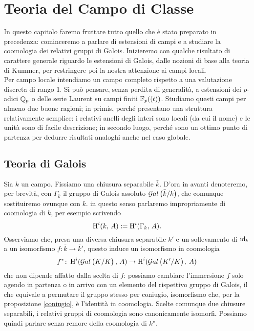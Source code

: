 \chapter{Teoria del Campo di Classe}
In questo capitolo faremo fruttare tutto quello che è stato preparato in precedenza: cominceremo a parlare di estensioni di campi e a studiare la coomologia dei relativi gruppi di Galois. Inizieremo con qualche risultato di carattere generale riguardo le estensioni di Galois, dalle nozioni di base alla teoria di Kummer, per restringere poi la nostra attenzione ai campi locali. \\

Per campo locale intendiamo un campo completo rispetto a una valutazione discreta di rango 1. Si può pensare, senza perdita di generalità, a estensioni dei $ p $-adici $ \mathbb{Q}_p $ o delle serie Laurent su campi finiti $ \mathbb{F}_p((t)) $. Studiamo questi campi per almeno due buone ragioni; in primis, perché presentano una struttura relativamente semplice: i relativi anelli degli interi sono locali (da cui il nome) e le unità sono di facile descrizione; in secondo luogo, perché sono un ottimo punto di partenza per dedurre risultati analoghi anche nel caso globale.



\section{Teoria di Galois}
Sia $ k $ un campo. Fissiamo una chiusura separabile $ \bar{k} $. D'ora in avanti denoteremo, per brevità, con $ \Gamma_k $ il gruppo di Galois assoluto $ \mathcal{G}al\left( \bar{k} / k \right) $, che comunque sostituiremo ovunque con $ k $. in questo senso parlaremo impropriamente di coomologia di $ k $, per esempio scrivendo
\[ \operatorname{H}^i(k, \, A) := \operatorname{H}^i(\Gamma_k, \, A). \]
Osserviamo che, presa una diversa chiusura separabile $ k' $ e un sollevamento di $ \operatorname{id}_{k} $ a un isomorfismo $ f\colon \bar{k} \to \bar{k}' $, questo induce un isomorfismo in coomologia
\[ f^* \colon \operatorname{H}^i(\mathcal{G}al\left( \bar{K} / K \right), \, A) \to \operatorname{H}^i(\mathcal{G}al\left( \bar{K}' / K \right), \, A) \]
che non dipende affatto dalla scelta di $ f $: possiamo cambiare l'immersione $ f $ solo agendo in partenza o in arrivo con un elemento del rispettivo gruppo di Galois, il che equivale a permutare il gruppo stesso per coniugio, isomorfismo che, per la proposizione \ref{coniugio}, è l'identità in coomologia. Scelte comunque due chiusure separabili, i relativi gruppi di coomologia sono canonicamente isomorfi. Possiamo quindi parlare senza remore della \leftquote coomologia di $ k $". \\

